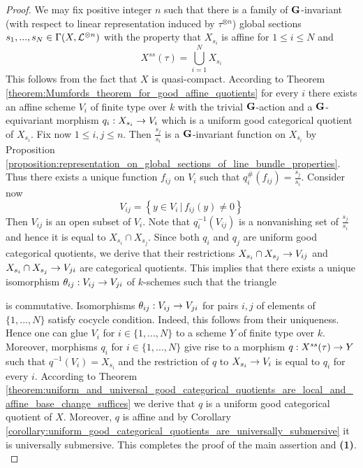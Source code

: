 \begin{proof}
We may fix positive integer $n$ such that there is a family of $\mathbf{G}$-invariant (with respect to linear representation induced by $\tau^{\otimes n}$) global sections $s_1,...,s_N\in \Gamma(X,{\mathcal L}^{\otimes n})$ with the property that $X_{s_i}$ is affine for $1\leq i \leq N$ and
$$X^{ss}(\tau) = \bigcup_{i=1}^NX_{s_i}$$
This follows from the fact that $X$ is quasi-compact. According to Theorem \ref{theorem:Mumfords_theorem_for_good_affine_quotients} for every $i$ there exists an affine scheme $V_i$ of finite type over $k$ with the trivial $\mathbf{G}$-action and a $\mathbf{G}$-equivariant morphism $q_i:X_{s_i}\rightarrow V_i$ which is a uniform good categorical quotient of $X_{s_i}$. Fix now $1\leq i,j\leq n$. Then $\frac{s_j}{s_i}$ is a $\mathbf{G}$-invariant function on $X_{s_i}$ by Proposition \ref{proposition:representation_on_global_sections_of_line_bundle_properties}. Thus there exists a unique function $f_{ij}$ on $V_i$ such that $q_i^{\#}(f_{ij}) = \frac{s_j}{s_i}$. Consider now 
$$V_{ij} = \left\{y\in V_i\,|\,f_{ij}(y) \neq 0\right\}$$
Then $V_{ij}$ is an open subset of $V_i$. Note that $q_i^{-1}(V_{ij})$ is a nonvanishing set of $\frac{s_j}{s_i}$ and hence it is equal to $X_{s_i}\cap X_{s_j}$. Since both $q_i$ and $q_j$ are uniform good categorical quotients, we derive that their restrictions $X_{s_i}\cap X_{s_j}\rightarrow V_{ij}$ and $X_{s_i}\cap X_{s_j}\rightarrow V_{ji}$ are categorical quotients. This implies that there exists a unique isomorphism $\theta_{ij}:V_{ij}\rightarrow V_{ji}$ of $k$-schemes such that the triangle
\begin{center}
\end{center}
is commutative. Isomorphisms $\theta_{ij}:V_{ij}\rightarrow V_{ji}$ for pairs $i,j$ of elements of $\{1,...,N\}$ satisfy cocycle condition. Indeed, this follows from their uniqueness. Hence one can glue $V_i$ for $i\in \{1,...,N\}$ to a scheme $Y$ of finite type over $k$. Moreover, morphisms $q_i$ for $i\in \{1,...,N\}$ give rise to a morphism $q:X^{ss}(\tau)\rightarrow Y$ such that $q^{-1}(V_i) = X_{s_i}$ and the restriction of $q$ to $X_{s_i}\rightarrow V_i$ is equal to $q_i$ for every $i$. According to Theorem \ref{theorem:uniform_and_universal_good_categorical_quotients_are_local_and_affine_base_change_suffices} we derive that $q$ is a uniform good categorical quotient of $X$. Moreover, $q$ is affine and by Corollary \ref{corollary:uniform_good_categorical_quotients_are_universally_submersive} it is universally submersive. This completes the proof of the main assertion and \textbf{(1)}.\\

\end{proof}
